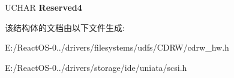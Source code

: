 \begin{DoxyCompactItemize}
\begin{tabbing}
\end{tabbing}\item 
\mbox{\label{struct___m_o_d_e___r_e_a_d___w_r_i_t_e___r_e_c_o_v_e_r_y___p_a_g_e_abddc96a7361e102c3e53c53710627e5c}} 
U\+C\+H\+AR {\bfseries Reserved4}
\end{DoxyCompactItemize}


该结构体的文档由以下文件生成\+:\begin{DoxyCompactItemize}
\item 
E\+:/\+React\+O\+S-\/0../drivers/filesystems/udfs/\+C\+D\+R\+W/cdrw\+\_\+hw.\+h\item 
E\+:/\+React\+O\+S-\/0../drivers/storage/ide/uniata/scsi.\+h\end{DoxyCompactItemize}
